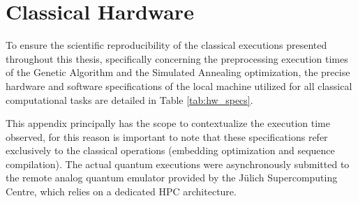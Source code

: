 \chapter{Classical Hardware}
\label{app:hardware_specs}

To ensure the scientific reproducibility of the classical executions presented throughout this thesis, specifically concerning the preprocessing execution times of the Genetic Algorithm and the Simulated Annealing optimization, the precise hardware and software specifications of the local machine utilized for all classical computational tasks are detailed in Table \ref{tab:hw_specs}.

\begin{table}[htbp]
    \centering
    \renewcommand{\arraystretch}{1.3} 
    \caption{Hardware and OS configuration of the local machine used for the classical embedding optimization and preprocessing phases.}
    \label{tab:hw_specs}
\end{table}
This appendix principally has the scope to contextualize the execution time observed, for this reason
is important to note that these specifications refer exclusively to the classical operations (embedding optimization and sequence compilation). The actual quantum executions were asynchronously submitted to the remote analog quantum emulator provided by the Jülich Supercomputing Centre, which relies on a dedicated HPC architecture.